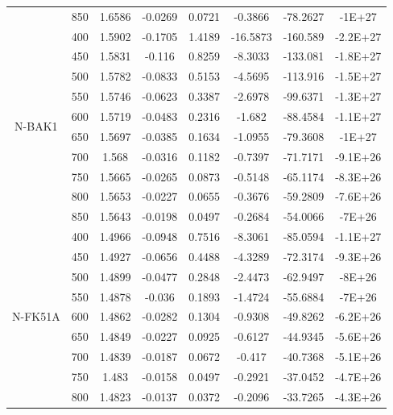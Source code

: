 {\begin{longtable}{cccccccc}
                          & 850 & 1.6586 & -0.0269 & 0.0721 & -0.3866  & -78.2627 & -1E+27   \\
\multirow{10}{*}{N-BAK1}  & 400 & 1.5902 & -0.1705 & 1.4189 & -16.5873 & -160.589 & -2.2E+27 \\
                          & 450 & 1.5831 & -0.116  & 0.8259 & -8.3033  & -133.081 & -1.8E+27 \\
                          & 500 & 1.5782 & -0.0833 & 0.5153 & -4.5695  & -113.916 & -1.5E+27 \\
                          & 550 & 1.5746 & -0.0623 & 0.3387 & -2.6978  & -99.6371 & -1.3E+27 \\
                          & 600 & 1.5719 & -0.0483 & 0.2316 & -1.682   & -88.4584 & -1.1E+27 \\
                          & 650 & 1.5697 & -0.0385 & 0.1634 & -1.0955  & -79.3608 & -1E+27   \\
                          & 700 & 1.568  & -0.0316 & 0.1182 & -0.7397  & -71.7171 & -9.1E+26 \\
                          & 750 & 1.5665 & -0.0265 & 0.0873 & -0.5148  & -65.1174 & -8.3E+26 \\
                          & 800 & 1.5653 & -0.0227 & 0.0655 & -0.3676  & -59.2809 & -7.6E+26 \\
                          & 850 & 1.5643 & -0.0198 & 0.0497 & -0.2684  & -54.0066 & -7E+26   \\ \hline
\multirow{10}{*}{N-FK51A} & 400 & 1.4966 & -0.0948 & 0.7516 & -8.3061  & -85.0594 & -1.1E+27 \\
                          & 450 & 1.4927 & -0.0656 & 0.4488 & -4.3289  & -72.3174 & -9.3E+26 \\
                          & 500 & 1.4899 & -0.0477 & 0.2848 & -2.4473  & -62.9497 & -8E+26   \\
                          & 550 & 1.4878 & -0.036  & 0.1893 & -1.4724  & -55.6884 & -7E+26   \\
                          & 600 & 1.4862 & -0.0282 & 0.1304 & -0.9308  & -49.8262 & -6.2E+26 \\
                          & 650 & 1.4849 & -0.0227 & 0.0925 & -0.6127  & -44.9345 & -5.6E+26 \\
                          & 700 & 1.4839 & -0.0187 & 0.0672 & -0.417   & -40.7368 & -5.1E+26 \\
                          & 750 & 1.483  & -0.0158 & 0.0497 & -0.2921  & -37.0452 & -4.7E+26 \\
                          & 800 & 1.4823 & -0.0137 & 0.0372 & -0.2096  & -33.7265 & -4.3E+26 \\

\end{longtable}}
